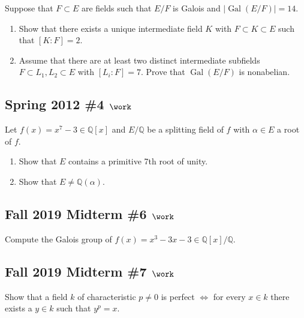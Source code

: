 Suppose that \(F\subset E\) are fields such that \(E/F\) is Galois and
\({\left\lvert {{ \operatorname{Gal}} (E/F)} \right\rvert} = 14\).

\begin{enumerate}
\def\labelenumi{\alph{enumi}.}
\item
  Show that there exists a unique intermediate field \(K\) with
  \(F\subset K \subset E\) such that \([K: F] = 2\).
\item
  Assume that there are at least two distinct intermediate subfields
  \(F \subset L_1, L_2 \subset E\) with \([L_i: F]= 7\). Prove that
  \({ \operatorname{Gal}} (E/F)\) is nonabelian.
\end{enumerate}

\hypertarget{spring-2012-4-work}{%
\subsection{\texorpdfstring{Spring 2012 \#4
\(\work\)}{Spring 2012 \#4 \textbackslash work}}\label{spring-2012-4-work}}

Let \(f(x) = x^7 - 3\in {\mathbb{Q}}[x]\) and \(E/{\mathbb{Q}}\) be a
splitting field of \(f\) with \(\alpha \in E\) a root of \(f\).

\begin{enumerate}
\def\labelenumi{\alph{enumi}.}
\item
  Show that \(E\) contains a primitive 7th root of unity.
\item
  Show that \(E\neq {\mathbb{Q}}(\alpha)\).
\end{enumerate}

\hypertarget{fall-2019-midterm-6-work}{%
\subsection{\texorpdfstring{Fall 2019 Midterm \#6
\(\work\)}{Fall 2019 Midterm \#6 \textbackslash work}}\label{fall-2019-midterm-6-work}}

Compute the Galois group of
\(f(x) = x^3-3x -3\in {\mathbb{Q}}[x]/{\mathbb{Q}}\).

\hypertarget{fall-2019-midterm-7-work}{%
\subsection{\texorpdfstring{Fall 2019 Midterm \#7
\(\work\)}{Fall 2019 Midterm \#7 \textbackslash work}}\label{fall-2019-midterm-7-work}}

Show that a field \(k\) of characteristic \(p\neq 0\) is perfect
\(\iff\) for every \(x\in k\) there exists a \(y\in k\) such that
\(y^p=x\).


